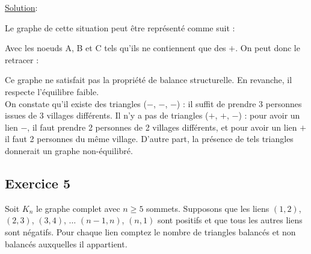     \noindent \underline{Solution}:

    Le graphe de cette situation peut être représenté comme suit :
    \begin{center}
    \end{center}

    Avec les noeuds A, B et C tels qu'ils ne contiennent que des $+$.
    On peut donc le retracer :

    \begin{center}
    \end{center}

    Ce graphe ne satisfait pas la propriété de balance structurelle.
    En revanche, il respecte l'équilibre faible.\\
    On constate qu'il existe des triangles ($-$, $-$, $-$) : il suffit de prendre 3 personnes issues de 3 villages différents.
    Il n'y a pas de triangles ($+$, $+$, $-$) : pour avoir un lien $-$, il faut prendre 2 personnes de 2 villages différents, et pour avoir un lien $+$ il faut 2 personnes du même village. D'autre part, la présence de tels triangles donnerait un graphe non-équilibré.


\subsection*{Exercice 5}
Soit $K_n$ le graphe complet avec $n \geq 5$ sommets. Supposons que les liens $(1, 2)$, $(2, 3)$, $(3, 4)$, $\ldots$ $(n - 1, n)$, $(n, 1)$ sont positifs et que tous les autres
liens sont n\'{e}gatifs. Pour chaque lien comptez le nombre de triangles balanc\'{e}s et non balanc\'{e}s auxquelles il appartient.

